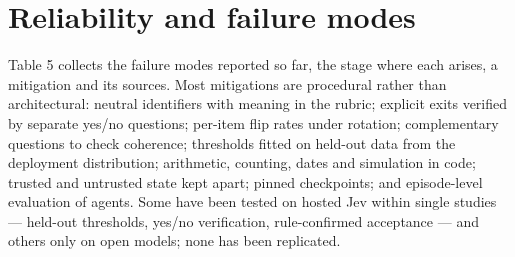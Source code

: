 \section{Reliability and failure modes}\label{sec:reliability-and-failure-modes}

Table 5 collects the failure modes reported so far, the stage where each arises, a mitigation and its sources. Most mitigations are procedural rather than architectural: neutral identifiers with meaning in the rubric; explicit exits verified by separate yes/no questions; per-item flip rates under rotation; complementary questions to check coherence; thresholds fitted on held-out data from the deployment distribution; arithmetic, counting, dates and simulation in code; trusted and untrusted state kept apart; pinned checkpoints; and episode-level evaluation of agents. Some have been tested on hosted Jev within single studies — held-out thresholds, yes/no verification, rule-confirmed acceptance — and others only on open models; none has been replicated.

